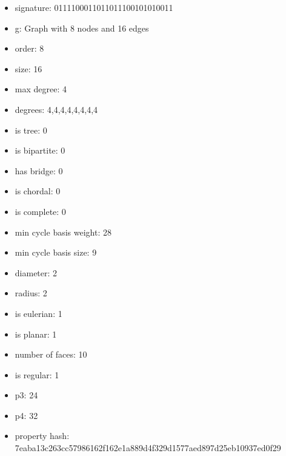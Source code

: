 \newpage
\begin{figure}
\end{figure}
\begin{itemize}
\item signature: 0111100011011011100101010011
\item g: Graph with 8 nodes and 16 edges
\item order: 8
\item size: 16
\item max degree: 4
\item degrees: 4,4,4,4,4,4,4,4
\item is tree: 0
\item is bipartite: 0
\item has bridge: 0
\item is chordal: 0
\item is complete: 0
\item min cycle basis weight: 28
\item min cycle basis size: 9
\item diameter: 2
\item radius: 2
\item is eulerian: 1
\item is planar: 1
\item number of faces: 10
\item is regular: 1
\item p3: 24
\item p4: 32
\item property hash: 7eaba13c263cc57986162f162e1a889d4f329d1577aed897d25eb10937ed0f29
\end{itemize}
\newpage
